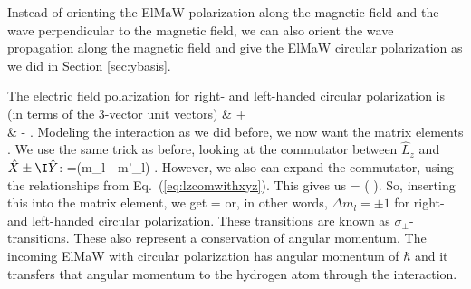 Instead of orienting the ElMaW polarization along the magnetic field and the wave perpendicular to the magnetic field, we can also orient the wave propagation along the magnetic field and give the ElMaW circular polarization as we did in Section \ref{sec:ybasis}. 
\begin{marginfigure}
\centering
{}
\end{marginfigure}%
The electric field polarization for right- and left-handed circular polarization is (in terms of the 3-vector unit vectors)
\bas
{}&  + \I {}\\
& - \I {}.
\eas
Modeling the interaction as we did before, we now want the matrix elements
\beq
{} \pm \I {}.
\eeq
We use the same trick as before, looking at the commutator between $\hat{L}_z$ and $\hat{X} \pm \I \hat{Y}$:
\beq
{}=\hbar\left(m_l - m'_l\right) \pm \I {}.
\eeq{}
However, we also can expand the commutator, using the relationships from Eq.~(\ref{eq:lzcomwithxyz}). This gives us
\beq
{} = \pm\hbar\left( \pm \I {}\right).
\eeq{}
So, inserting this into the matrix element, we get
\beq
{}=\pm\hbar{} \pm \I {}
\eeq
or, in other words, $\Delta m_l = \pm 1$ for right- and left-handed circular polarization. These transitions are known as {\em $\sigma_\pm$}-transitions. These also represent a conservation of angular momentum. The incoming ElMaW with circular polarization has angular momentum of $\hbar$ and it transfers that angular momentum to the hydrogen atom through the interaction.

